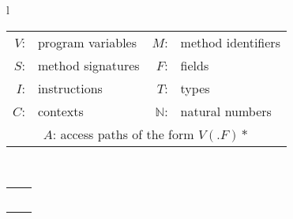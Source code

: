 \begin{figure}[tb!p]
\hspace{-2.5mm}
\begin{tabular}{l}
  \begin{small}
\begin{tabular}{r l r l}
	$V$: & program variables &  $M$: & method identifiers \\
	$S$: & method signatures &  $F$: & fields \\
	$I$: & instructions &  $T$: & types \\
	$C$: & contexts &  $\mathbb{N}$: & natural numbers \\
  \multicolumn{4}{c}{$A$: access paths of the form $V$$(.F)*$} \\
\end{tabular}  \end{small} \\
\hhline{=}
\hspace{-3mm}
\begin{tabular}{l l}
\rel{Move}{i: I, to: V, from: V}                & \args{\# i: to = from} \\
\rel{Load}{i: I, to: V, base: V, fld: F}       & \args{\# i: to = base.fld}\\
\rel{Store}{i: I, base: V, fld: F, from: V} & \args{\# i: base.fld = from} \\
\rel{Call}{i: I, base: V, sig: S}              & \args{\# i: base.sig(..)}   \\
\rel{Phi}{i: I, to: V, from1: V, \ldots}       & \args{\# i: to = $\phi$(from1, \ldots)}\\

\end{tabular}
\end{tabular}
\end{figure}
